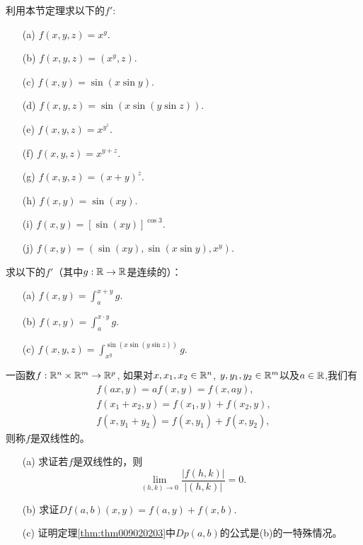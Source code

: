 \begin{problemset}
\item\label{exer009020210} 利用本节定理求以下的$f'$:
\begin{enumerate}
\item[(a)] $f(x, y, z) = x^y$.
\item[(b)] $f(x, y, z) = (x^y, z)$.
\item[(c)] $f(x, y) = \sin(x\sin{y})$.
\item[(d)] $f(x, y, z) = \sin(x\sin(y\sin{z}))$.
\item[(e)] $f(x, y, z) = x^{y^z}$.
\item[(f)] $f(x, y, z) = x^{y+z}$.
\item[(g)] $f(x, y, z) = (x + y)^z$.
\item[(h)] $f(x, y) = \sin(xy)$.
\item[(i)] $f(x, y) = [\sin(xy)]^{\cos{3}}$.
\item[(j)] $f(x, y) = (\sin(xy), \sin(x\sin{y}), x^y)$.
\end{enumerate}

\item 求以下的$f'$（其中$g:\mathbb{R} \to \mathbb{R}$是连续的）：
\begin{enumerate}
\item[(a)] $f(x, y) = \int_{a}^{x+y}{g}$.
\item[(b)] $f(x, y) = \int_{a}^{x \cdot y}{g}$.
\item[(c)] $f(x, y, z) = \int_{x^y}^{\sin(x\sin(y\sin{z}))}{g}$.
\end{enumerate}

\item 一函数$f: \mathbb{R}^n \times \mathbb{R}^m \to \mathbb{R}^p$, 如果对$x,x_1,x_2 \in \mathbb{R}^n$, $y, y_1, y_2 \in \mathbb{R}^m$以及$a \in \mathbb{R}$,我们有
\begin{gather*}
f(ax, y) = af(x,y) = f(x, ay),\\
f(x_1 + x_2, y) = f(x_1, y) + f(x_2, y),\\
f(x, y_1+y_2) = f(x, y_1) + f(x, y_2),
\end{gather*}
则称$f$是双线性的。
\begin{enumerate}
\item[(a)] 求证若$f$是双线性的，则
\[
\lim_{(h, k) \to 0}{\frac{|f(h, k)|}{|(h, k)|}} = 0.
\]

\item[(b)]求证$Df(a, b)(x, y) = f(a, y) + f(x, b)$.

\item[(c)]证明定理\ref{thm:thm009020203}中$Dp(a, b)$的公式是(b)的一特殊情况。
\end{enumerate}


\end{problemset}
